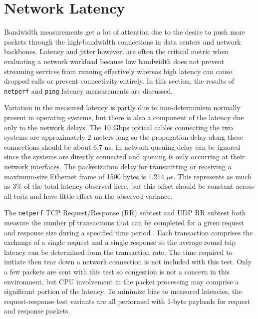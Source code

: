 

\section{Network Latency} %
\label{sec:networklatency}
Bandwidth measurements get a lot of attention due to the desire to push more packets through the high-bandwidth connections in data centers and network backbones.
Latency and jitter however, are often the critical metric when evaluating a network workload because low bandwidth does not prevent streaming services from running effectively whereas high latency can cause dropped calls or prevent connectivity entirely.
In this section, the results of \texttt{netperf} and \texttt{ping} latency measurements are discussed.  

Variation in the measured latency is partly due to non-determinism normally present in operating systems, but there is also a component of the latency due only to the network delays.
The 10 Gbps optical cables connecting the two systems are approximately 2 meters long so the propagation delay along these connections should be about 6.7 ns.
In-network queuing delay can be ignored since the systems are directly connected and queuing is only occurring at their network interfaces.
The packetization delay for transmitting or receiving a maximum-size Ethernet frame of 1500 bytes is 1.214 $\mu$s.
This represents as much as 3\% of the total latency observed here, but this offset should be constant across all tests and have little effect on the observed variance. 

The \texttt{netperf} TCP Request/Response (RR) subtest and UDP RR subtest both measure the number pf transactions that can be completed for a given request and response size during a specified time period \autocite{netperfTraining}.
Each transaction comprises the exchange of a single request and a single response so the average round trip latency can be determined from the transaction rate.  
The time required to initiate then tear down a network connection is not included with this test.  
Only a few packets are sent with this test so congestion is not a concern in this environment, but CPU involvement in the packet processing may comprise a significant portion of the latency.  
To minimize bias to measured latencies, the request-response test variants are all performed with 1-byte payloads for request and response packets.

